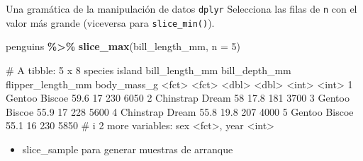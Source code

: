 \documentclass[
  ignorenonframetext,
  aspectratio=169]{beamer}
\newenvironment{Shaded}{\begin{snugshade}}{\end{snugshade}}
\newcommand{\AttributeTok}[1]{\textcolor[rgb]{0.13,0.29,0.53}{#1}}
\newcommand{\DecValTok}[1]{\textcolor[rgb]{0.00,0.00,0.81}{#1}}
\newcommand{\FunctionTok}[1]{\textcolor[rgb]{0.13,0.29,0.53}{\textbf{#1}}}
\newcommand{\NormalTok}[1]{#1}
\newcommand{\SpecialCharTok}[1]{\textcolor[rgb]{0.81,0.36,0.00}{\textbf{#1}}}
\providecommand{\tightlist}{%
  \setlength{\itemsep}{0pt}\setlength{\parskip}{0pt}}
\let\oldverbatim\verbatim
\let\endoldverbatim\endverbatim
\renewenvironment{verbatim}{\tiny\oldverbatim}{\endoldverbatim}
\begin{document}
\begin{frame}[fragile]{Una gramática de la manipulación de datos
\texttt{dplyr}}
\label{una-gramuxe1tica-de-la-manipulaciuxf3n-de-datos-dplyr-3}
Selecciona las filas de \texttt{n} con el valor más grande (viceversa
para \texttt{slice\_min()}).

\begin{Shaded}
\begin{Highlighting}[]
\NormalTok{penguins }\SpecialCharTok{\%\textgreater{}\%} 
  \FunctionTok{slice\_max}\NormalTok{(bill\_length\_mm, }\AttributeTok{n =} \DecValTok{5}\NormalTok{)}
\end{Highlighting}
\end{Shaded}

\begin{verbatim}
# A tibble: 5 x 8
  species   island bill_length_mm bill_depth_mm flipper_length_mm body_mass_g
  <fct>     <fct>           <dbl>         <dbl>             <int>       <int>
1 Gentoo    Biscoe           59.6          17                 230        6050
2 Chinstrap Dream            58            17.8               181        3700
3 Gentoo    Biscoe           55.9          17                 228        5600
4 Chinstrap Dream            55.8          19.8               207        4000
5 Gentoo    Biscoe           55.1          16                 230        5850
# i 2 more variables: sex <fct>, year <int>
\end{verbatim}

\begin{itemize}
\tightlist
\item
  slice\_sample para generar muestras de arranque
\end{itemize}
\end{frame}
\end{document}
